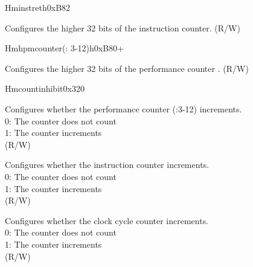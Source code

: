 \begin{register}{H}{minstreth}{0xB82}\label{regdesc:LPMINSTRETH}
%
\regnewline%
\begin{regdesc}\begin{reglist}
\label{fielddesc:LPMINSTRETH}\item [MINSTRETH] Configures the higher 32 bits of the instruction counter. (R/W)
\end{reglist}\end{regdesc}
\end{register}


\begin{register}{H}{mhpmcounter(: 3-12)h}{0xB80+}\label{regdesc:LPMHPMCOUNTERH}
%
\regnewline%
\begin{regdesc}\begin{reglist}
\label{fielddesc:LPMHMPCOUNTERH}\item [MHPMCOUNTER\regindex{n}h] Configures the higher 32 bits of the performance counter . (R/W)
\end{reglist}\end{regdesc}
\end{register}


\begin{register}{H}{mcountinhibit}{0x320}\label{regdesc:LPMCOUNTINHIBIT}
%
%
%
%
\regnewline%
\begin{regdesc}\begin{reglist}
\label{fielddesc:LPMCOUNTINHIBITHPM}\item [HPM] Configures whether the performance counter (:3-12) increments. \\
0: The counter does not count\\
1: The counter increments\\
(R/W)
\label{fielddesc:LPMCOUNTINHIBITIR}\item [IR] Configures whether the instruction counter increments. \\
0: The counter does not count\\
1: The counter increments\\
(R/W)
\label{fielddesc:LPMCOUNTINHIBITCY}\item [CY] Configures whether the clock cycle counter increments. \\
0: The counter does not count\\
1: The counter increments\\
(R/W)
\end{reglist}\end{regdesc}
\end{register}
